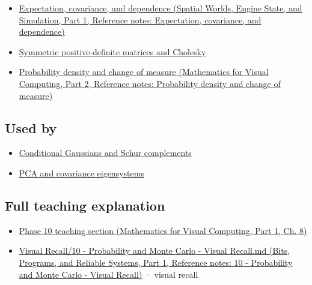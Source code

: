 \begin{itemize}
\tightlist
\item
  \href{../05-Spatial-Worlds-Engine-State-and-Simulation-P01/main.pdf\#appendix-54c383df9992}{Expectation, covariance, and dependence (Spatial Worlds, Engine State, and Simulation, Part 1, Reference notes: Expectation, covariance, and dependence)}
\item
  \hyperref[appendix-50d2ea3c9b26]{Symmetric positive-definite matrices and Cholesky}
\item
  \href{../02-Mathematics-for-Visual-Computing-P02/main.pdf\#appendix-4815cd87ab8b}{Probability density and change of measure (Mathematics for Visual Computing, Part 2, Reference notes: Probability density and change of measure)}
\end{itemize}

\subsection{Used by}\label{appendix-12bbe185dbe5-used-by}

\hypertarget{appendix-12bbe185dbe5-used-by}{}

\begin{itemize}
\tightlist
\item
  \hyperref[appendix-f0437ea55a47]{Conditional Gaussians and Schur complements}
\item
  \hyperref[appendix-ad175ef3c5bf]{PCA and covariance eigensystems}
\end{itemize}

\subsection{Full teaching explanation}\label{appendix-12bbe185dbe5-full-teaching-explanation}

\hypertarget{appendix-12bbe185dbe5-full-teaching-explanation}{}

\begin{itemize}
\tightlist
\item
  \href{../02-Mathematics-for-Visual-Computing-P01/main.pdf\#02-foundations-ii-ch024-waiting-times-event-counts-and-covariance-geometry}{Phase 10 teaching section (Mathematics for Visual Computing, Part 1, Ch. 8)}
\item
  \href{../01-Bits-Programs-and-Reliable-Systems-P01/main.pdf\#appendix-cb5af353ef77}{Visual Recall/10 - Probability and Monte Carlo - Visual Recall.md (Bits, Programs, and Reliable Systems, Part 1, Reference notes: 10 - Probability and Monte Carlo - Visual Recall)} · visual recall
\end{itemize}

